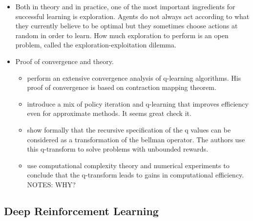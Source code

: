 \documentclass[11pt,english]{article}
\begin{document}
\begin{itemize}
		\item Both in theory and in practice, one of the most important ingredients for successful learning is exploration. Agents do not always act according to what they currently believe to be optimal but they sometimes choose actions at random in order to learn. How much exploration to perform is an open problem, called the exploration-exploitation dilemma. \medskip
\item Proof of convergence and theory.
\begin{itemize}
\item \citet{tsitsiklis1994} perform an extensive convergence analysis of q-learning algorithms. His proof of convergence is based on contraction mapping theorem.
\item \citet{bertsekas2012} introduce a mix of policy iteration and q-learning
that improves efficiency even for approximate methods. It seems great
check it.
\item \citet{ma2020} show formally that the recursive specification of
the q values can be considered as a transformation of the bellman
operator. The authors use this q-transform to solve problems with
unbounded rewards.
\item \citet{ma2021} use computational complexity theory and numerical
experiments to conclude that the q-transform leads to gains in computational
efficiency. NOTES: WHY?


\end{itemize}
\end{itemize}

\subsection{Deep Reinforcement Learning}
\end{document}
